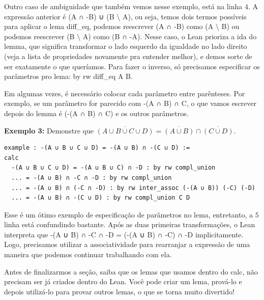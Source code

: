 Outro caso de ambiguidade que também vemos nesse exemplo, está na linha $4$. A expressão anterior é {\selectfont (A ∩ -B) ∪ (B $\setminus$ A)}, ou seja, temos dois termos possíveis para aplicar o lema {\selectfont diff\_eq}, podemos reescrever {\selectfont (A ∩ -B)} como {\selectfont (A $\setminus$ B)} ou podemos reescrever  {\selectfont (B $\setminus$ A)} como {\selectfont (B ∩ -A)}. Nesse caso, o Lean prioriza a ida do lemma, que significa transformar o lado esquerdo da igualdade no lado direito (veja a lista de propriedades novamente pra entender melhor), e demos sorte de ser exatamente o que queríamos. Para fazer o inverso, só precisamos especificar os parâmetros pro lema: {\selectfont by rw diff\_eq A B}.

Em algumas vezes, é necessário colocar cada parâmetro entre parênteses. Por exemplo, se um parâmetro for parecido com {\selectfont -(A ∩ B) ∩ C}, o que vamos escrever depois do lemma é {\selectfont (-(A ∩ B) ∩ C)} e os outros parâmetros.

\textbf{Exemplo 3:} Demonstre que $\overline{(A \cup B \cup C \cup D)} = \overline{(A \cup B)} \cap \overline{(C \cup D)}$.

\begin{lstlisting}
example : -(A ∪ B ∪ C ∪ D) = -(A ∪ B) ∩ -(C ∪ D) :=
calc
  -(A ∪ B ∪ C ∪ D) = -(A ∪ B ∪ C) ∩ -D : by rw compl_union
  ... = -(A ∪ B) ∩ -C ∩ -D : by rw compl_union
  ... = -(A ∪ B) ∩ (-C ∩ -D) : by rw inter_assoc (-(A ∪ B)) (-C) (-D)
  ... = -(A ∪ B) ∩ -(C ∪ D) : by rw compl_union C D \end{lstlisting}

Esse é um ótimo exemplo de especificação de parâmetros no lema, entretanto, a $5$ linha está confundindo bastante. Após as duas primeiras transformações, o Lean interpreta que {\selectfont -(A ∪ B) ∩ -C ∩ -D = (-(A ∪ B) ∩ -C) ∩ -D} implicitamente. Logo, precisamos utilizar a associatividade para rearranjar a expressão de uma maneira que podemos continuar trabalhando com ela.

Antes de finalizarmos a seção, saiba que os lemas que usamos dentro do {\selectfont calc}, não precisam ser já criados dentro do Lean. Você pode criar um lema, prová-lo e depois utilizá-lo para provar outros lemas, o que se torna muito divertido!
